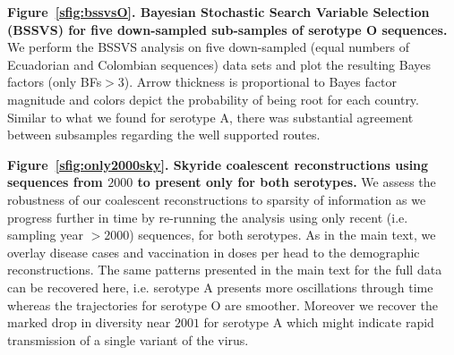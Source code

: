 \documentclass[a4paper,10pt]{article}
\begin{document}
\textbf{Figure~\ref{sfig:bssvsO}. Bayesian Stochastic Search Variable Selection (BSSVS) for five down-sampled sub-samples of serotype O sequences.}
We perform the BSSVS analysis on five down-sampled (equal numbers of Ecuadorian and Colombian sequences) data sets and plot the resulting Bayes factors (only BFs$>3$).
Arrow thickness is proportional to Bayes factor magnitude and colors depict the probability of being root for each country.
Similar to what we found for serotype A, there was substantial agreement between subsamples regarding the well supported routes.

\textbf{Figure~\ref{sfig:only2000sky}. Skyride coalescent reconstructions using sequences from $2000$ to present only for both serotypes.}
We assess the robustness of our coalescent reconstructions to sparsity of information as we progress further in time by re-running the analysis using only recent (i.e. sampling year $>2000$) sequences, for both serotypes.
As in the main text, we overlay disease cases and vaccination in doses per head to the demographic reconstructions.
The same patterns presented in the main text for the full data can be recovered here, i.e. serotype A presents more oscillations through time whereas the trajectories for serotype O are smoother.
Moreover we recover the marked drop in diversity near $2001$ for serotype A which might indicate rapid transmission of a single variant of the virus.
\end{document}
